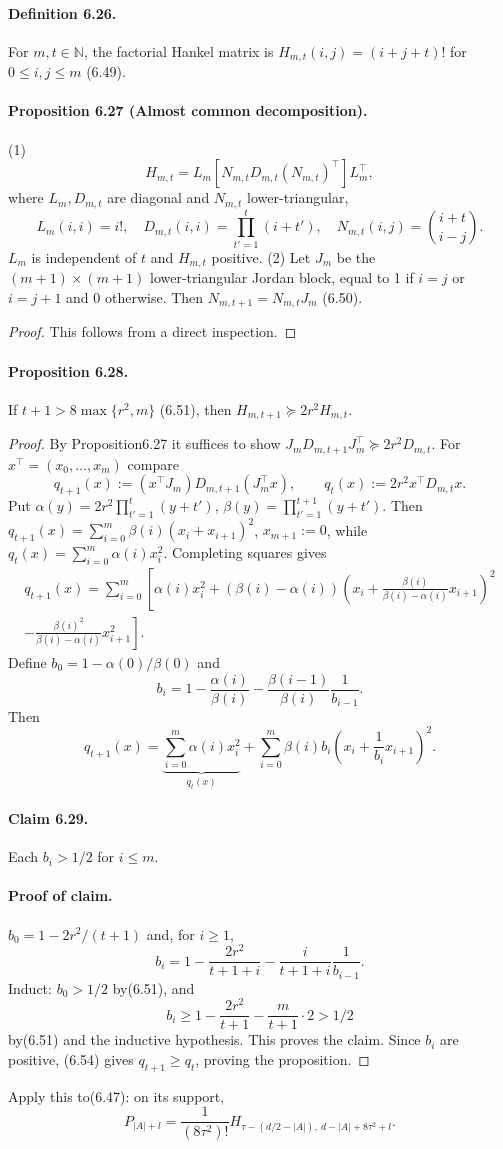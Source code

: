 \paragraph{Definition 6.26.} For $m,t\in\mathbb N$, the factorial Hankel matrix is $H_{m,t}(i,j)=(i+j+t)!$ for $0\le i,j\le m$ (6.49).
\paragraph{Proposition 6.27 (Almost common decomposition).} (1)
\[H_{m,t}=L_m[N_{m,t}D_{m,t}(N_{m,t})^\top]L_m^\top,\]
where $L_m,D_{m,t}$ are diagonal and $N_{m,t}$ lower-triangular,
\[L_m(i,i)=i!,\quad D_{m,t}(i,i)=\prod_{t'=1}^t(i+t'),\quad N_{m,t}(i,j)=\binom{i+t}{i-j}.\]
$L_m$ is independent of $t$ and $H_{m,t}$ positive. (2) Let $J_m$ be the $(m+1)\times(m+1)$ lower-triangular Jordan block, equal to 1 if $i=j$ or $i=j+1$ and 0 otherwise. Then $N_{m,t+1}=N_{m,t}J_m$ (6.50).
\begin{proof}This follows from a direct inspection.\end{proof}
\paragraph{Proposition 6.28.} If $t+1>8\max\{r^2,m\}$ (6.51), then $H_{m,t+1}\succeq2r^2H_{m,t}$.
\begin{proof}By Proposition6.27 it suffices to show $J_mD_{m,t+1}J_m^\top\succeq2r^2D_{m,t}$. For $x^\top=(x_0,\ldots,x_m)$ compare
\[q_{t+1}(x):=(x^\top J_m)D_{m,t+1}(J_m^\top x),\qquad q_t(x):=2r^2x^\top D_{m,t}x.\tag{6.52}\]
Put $\alpha(y)=2r^2\prod_{t'=1}^t(y+t')$, $\beta(y)=\prod_{t'=1}^{t+1}(y+t')$. Then $q_{t+1}(x)=\sum_{i=0}^m\beta(i)(x_i+x_{i+1})^2$, $x_{m+1}:=0$, while $q_t(x)=\sum_{i=0}^m\alpha(i)x_i^2$. Completing squares gives
\begin{multline*}q_{t+1}(x)=\sum_{i=0}^m\left[\alpha(i)x_i^2+(\beta(i)-\alpha(i))\left(x_i+\frac{\beta(i)}{\beta(i)-\alpha(i)}x_{i+1}\right)^2\right.\\\left.-\frac{\beta(i)^2}{\beta(i)-\alpha(i)}x_{i+1}^2\right].\end{multline*}
Define $b_0=1-\alpha(0)/\beta(0)$ and
\[b_i=1-\frac{\alpha(i)}{\beta(i)}-\frac{\beta(i-1)}{\beta(i)}\frac1{b_{i-1}}.\tag{6.53}\]
Then
\[q_{t+1}(x)=\underbrace{\sum_{i=0}^m\alpha(i)x_i^2}_{q_t(x)}+\sum_{i=0}^m\beta(i)b_i\left(x_i+\frac1{b_i}x_{i+1}\right)^2.\tag{6.54}\]
\paragraph{Claim 6.29.} Each $b_i>1/2$ for $i\le m$.
\paragraph{Proof of claim.} $b_0=1-2r^2/(t+1)$ and, for $i\ge1$,
\[b_i=1-\frac{2r^2}{t+1+i}-\frac i{t+1+i}\frac1{b_{i-1}}.\tag{6.55}\]
Induct: $b_0>1/2$ by(6.51), and
\[b_i\ge1-\frac{2r^2}{t+1}-\frac m{t+1}\cdot2>1/2\]
by(6.51) and the inductive hypothesis. This proves the claim. Since $b_i$ are positive, (6.54) gives $q_{t+1}\ge q_t$, proving the proposition.\end{proof}
Apply this to(6.47): on its support,
\[P_{|A|+l}=\frac1{(8\tau^2)!}H_{\tau-(d/2-|A|),\ d-|A|+8\tau^2+l}.\]
